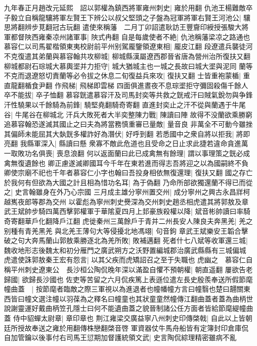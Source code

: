 九年春正月趙改元延熙　詔以郭權為鎮西將軍雍州刺史|{
	雍於用翻}
仇池王楊難敵卒子毅立自稱龍驤將軍左賢王下辨公以叔父堅頭之子盤為冠軍將軍右賢王河池公|{
	驤思將翻辨步莧翻冠古玩翻}
遣使來稱藩　二月丁卯詔遣耿訪王豐齎印綬授張駿大將軍都督陜西雍秦凉州諸軍事|{
	陜式冉翻}
自是每歲使者不絶|{
	仇池稱藩梁凉之路通也}
慕容仁以司馬翟楷領東夷校尉前平州别駕龎鑒領遼東相|{
	龎皮江翻}
段遼遣兵襲徒河不克復遣其弟蘭與慕容翰共攻柳城|{
	柳城縣漢屬遼西郡晉省唐為營州治所復扶又翻}
柳城都尉石琮城大慕輿埿并力拒守|{
	城大猶城主也一城之長故曰城大埿與泥同}
蘭等不克而退遼怒切責蘭等必令拔之休息二旬復益兵來攻|{
	復扶又翻}
士皆重袍蒙楯|{
	重直龍翻楯食尹翻}
作飛梯|{
	飛梯即雲梯}
四面俱進晝夜不息琮埿拒守彌固殺傷千餘人卒不能拔|{
	卒子恤翻}
慕容皝遣慕容汗及司馬封奕等共救之皝戒汗曰賊氣銳勿與争鋒汗性驍果以千餘騎為前鋒|{
	驍堅堯翻騎奇寄翻}
直進封奕止之汗不從與蘭遇于牛尾谷|{
	牛尾谷在柳城北}
汗兵大敗死者大半奕整陳力戰|{
	陳讀曰陣}
故得不没蘭欲乘勝窮追慕容翰恐遂滅其國止之曰夫為將當務慎重審已量敵|{
	量音良}
非萬全不可動今雖挫其偏師未能屈其大埶皝多權詐好為潛伏|{
	好呼到翻}
若悉國中之衆自將以拒我|{
	將即亮翻}
我縣軍深入|{
	縣讀曰懸}
衆寡不敵此危道也且受命之日止求此捷若違命貪進萬一取敗功名俱喪|{
	喪息浪翻}
何以返面蘭曰此已成禽無有餘理|{
	謂以事理策之皝必成禽無復遺餘也}
卿正慮遂滅卿國耳今千年在東若進而得志吾將迎之以為國嗣終不負卿使宗廟不祀也千年者慕容仁小字也翰曰吾投身相依無復還理|{
	復扶又翻}
國之存亡於我何有但欲為大國之計且相為惜功名耳|{
	為于偽翻}
乃命所部欲獨還蘭不得已而從之|{
	史言翰雖身在外乃心宗國}
三月成主雄分寧州置交州|{
	成分寧州之興古永昌牂柯越嶲夜郎等郡為交州}
以霍彪為寧州刺史㸑深為交州刺史趙丞相虎遣其將郭敖及章武王斌帥步騎四萬西擊郭權軍于華隂夏四月上邽豪族殺權以降|{
	斌音彬帥讀曰率騎奇寄翻華戶化翻降戶江翻}
虎徙秦州三萬餘戶于青并二州長安人陳良夫奔黑羌|{
	羌之别種有青羌黑羌}
與北羌王薄句大等侵擾北地馮翊|{
	句音鉤}
章武王斌樂安王韜合擊破之句大奔馬蘭山郭敖乘勝逐北為羌所敗|{
	敗補邁翻}
死者什七八斌等收軍還三城|{
	魏收地形志後魏太和初分雁門之廣武朔方之沃野置編城郡治廣武縣縣有三城偏城}
虎遣使誅郭敖秦王宏有怨言|{
	以其父疾而虎矯詔召之至于失職也}
虎幽之　慕容仁自稱平州刺史遼東公　長沙桓公陶侃晚年深以滿盈自懼不預朝權|{
	朝直遥翻}
屢欲告老歸國|{
	欲歸長沙國也}
佐吏等苦留之六月侃疾篤上表遜位遣左長史殷羨奉送所假節麾幢曲蓋　|{
	按節麾者臨敵之際三軍視以為進退者也幢幡幢方言曰幢翳也楚曰翿關東西皆曰幢文選注幢以羽葆為之釋名曰幢童也其狀童童然幢傳江翻曲蓋者蓋為曲柄世說謝靈運好戴曲柄笠孔隱士曰何不能遺曲蓋之貌晉制諸公任方面者皆給節麾緹幢曲蓋}
侍中貂蟬太尉章|{
	章印章也}
荆江雍梁交廣益寧八州刺史印傳棨戟|{
	自此以上皆朝廷所授故奉送之雍於用翻傳株戀翻棨音啓}
軍資器仗牛馬舟船皆有定簿封印倉庫侃自加管鑰以後事付右司馬王愆期加督護統領文武|{
	史言陶侃綜理精密雖病不亂}
